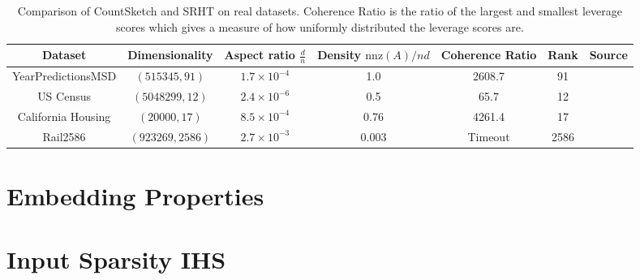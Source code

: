 \documentclass[twoside]{article}
\newcommand{\nnz}[1]{\text{nnz}(#1)}
\theoremstyle{definition}\newtheorem{thm}{Theorem}[section]
\theoremstyle{definition}\newtheorem{mydef}[thm]{Definition}
\theoremstyle{definition}\newtheorem{rem}[thm]{Remark}
\theoremstyle{definition}\newtheorem{prop}[thm]{Proposition}
\theoremstyle{definition}\newtheorem{example}[thm]{Example}
\theoremstyle{definition}\newtheorem{claim}[thm]{Claim}
\theoremstyle{definition}\newtheorem{Qu}[thm]{Question}
\theoremstyle{definition}\newtheorem{Lemma}[thm]{Lemma}
\theoremstyle{definition}\newtheorem{Cor}[thm]{Corollary}
\theoremstyle{definition}\newtheorem{Fact}[]{Fact}
\begin{document}
\begin{table}[ht]
\centering
\begin{adjustbox}{width=1\textwidth}

\begin{tabular}{|c|c|c|c|c|c|c|}
  \hline
Dataset                   & Dimensionality       &   Aspect ratio $\frac{d}{n}$ & Density $\nnz{A}/nd$ &  Coherence Ratio & Rank & Source \\
\hline
YearPredictionsMSD       & $(515345,91)$         &   $1.7 \times 10^{-4} $      & 1.0                  &  2608.7                 &  91   &  \cite{Dua:2017}             \\
US Census                & $(5048299, 12)$         & $2.4 \times 10^{-6}$       &
0.5                 &    65.7           &  12 &  \cite{census2000}\\
California Housing       & $(20000, 17)$         &   $8.5 \times 10^{-4} $      &  0.76                 & 4261.4                 & 17    &   \cite{geron2017hands}      \\
Rail2586                 & $(923269, 2586)$      &   $2.7 \times 10^{-3} $      &  0.003                &  Timeout                & 2586    &   \cite{davis2011university} \\
\hline
\end{tabular}
\end{adjustbox}
\caption{Comparison of CountSketch and SRHT on real datasets.
Coherence Ratio is the ratio of the largest and smallest leverage scores which
gives a measure of how uniformly distributed the leverage scores are.}
\label{table: data-facts}
\end{table}



\section{Embedding Properties} \label{sec: subspace-embedding-results}



\section{Input Sparsity IHS} \label{sec: countsketch-ihs}

\end{document}

